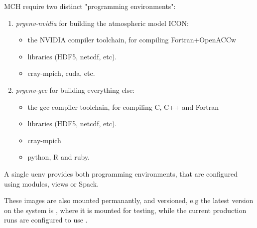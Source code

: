 MCH require two distinct "programming environments":
\begin{enumerate}
    \item \emph{prgenv-nvidia} for building the atmospheric model ICON:
    \begin{itemize}
        \item the NVIDIA compiler toolchain, for compiling Fortran+OpenACCw
        \item libraries (HDF5, netcdf, etc).
        \item cray-mpich, cuda, etc.
    \end{itemize}
    \item \emph{prgenv-gcc} for building everything else:
    \begin{itemize}
        \item the gcc compiler toolchain, for compiling C, C++ and Fortran
        \item libraries (HDF5, netcdf, etc).
        \item cray-mpich
        \item python, R and ruby.
    \end{itemize}
\end{enumerate}
A single uenv provides both programming environments, that are configured using modules, views or Spack.

These images are also mounted permanantly, and versioned, e.g the latest version on the system is , where it is mounted for testing, while the current production runs are configured to use .
